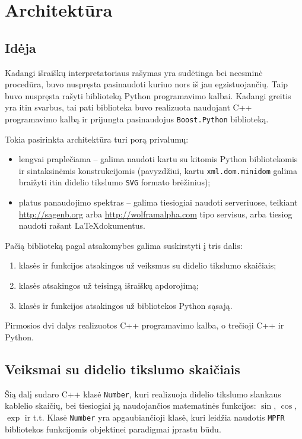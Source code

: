 \chapter{Architektūra}

\section{Idėja}

Kadangi išraiškų interpretatoriaus rašymas yra sudėtinga bei neesminė
procedūra, buvo nuspręsta pasinaudoti kuriuo nors iš jau egzistuojančių.
Taip buvo nuspręsta rašyti biblioteką Python programavimo kalbai. Kadangi
greitis yra itin svarbus, tai pati biblioteka buvo realizuota naudojant
C++ programavimo kalbą ir prijungta pasinaudojus \verb|Boost.Python| 
\cite{boost_python} biblioteką.

Tokia pasirinkta architektūra turi porą privalumų:
\begin{itemize}
  \item lengvai praplečiama – galima naudoti kartu su kitomis Python 
    bibliotekomis ir sintaksinėmis konstrukcijomis (pavyzdžiui, kartu
    \verb|xml.dom.minidom| galima braižyti itin didelio tikslumo 
    \verb|SVG| \cite{svg} formato brėžinius);
  \item platus panaudojimo spektras – galima tiesiogiai naudoti
    serveriuose, teikiant \url{http://sagenb.org} 
    arba \url{http://wolframalpha.com} tipo servisus, arba tiesiog
    naudoti rašant \LaTeX dokumentus.
\end{itemize}

Pačią biblioteką pagal atsakomybes galima suskirstyti į tris dalis:
\begin{enumerate}
  \item klasės ir funkcijos atsakingos už veiksmus su didelio tikslumo
    skaičiais;
  \item klasės atsakingos už teisingą išraiškų apdorojimą;
  \item klasės ir funkcijos atsakingos už bibliotekos Python sąsają.
\end{enumerate}
Pirmosios dvi dalys realizuotos C++ programavimo kalba, o trečioji
C++ ir Python.

\section{Veiksmai su didelio tikslumo skaičiais}

Šią dalį sudaro C++ klasė \verb|Number|, kuri realizuoja didelio tikslumo
slankaus kablelio skaičių, bei tiesiogiai ją naudojančios matematinės
funkcijos: $\sin$, $\cos$, $\exp$ ir t.t. Klasė \verb|Number| yra 
apgaubiančioji klasė, kuri leidžia naudotis \verb|MPFR| \cite{mpfr} 
bibliotekos funkcijomis objektinei paradigmai įprastu būdu.

